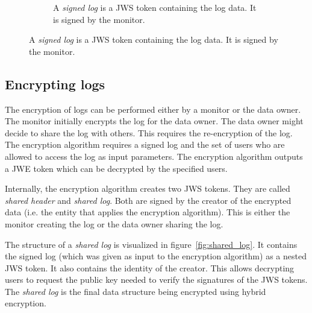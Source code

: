 \documentclass[../main.tex]{subfiles}
\begin{document}
\begin{figure}
\begin{subfigure}
        \centering
        \caption{A \textit{signed log} is a JWS token containing the log data. It is signed by the monitor.}
        \label{fig:signed_log}
    \end{subfigure}
\end{figure}


\subsection{Encrypting logs}
\label{sec:encrypting}
The encryption of logs can be performed either by a monitor or the data owner.
The monitor initially encrypts the log for the data owner.
The data owner might decide to share the log with others.
This requires the re-encryption of the log.
The encryption algorithm requires a signed log and the set of users who are allowed to access the log as input parameters.
The encryption algorithm outputs a JWE token which can be decrypted by the specified users.

Internally, the encryption algorithm creates two JWS tokens.
They are called \textit{shared header} and \textit{shared log}.
Both are signed by the creator of the encrypted data (i.e. the entity that applies the encryption algorithm).
This is either the monitor creating the log or the data owner sharing the log.

The structure of a \textit{shared log} is visualized in figure~\ref{fig:shared_log}.
It contains the signed log (which was given as input to the encryption algorithm) as a nested JWS token.
It also contains the identity of the creator.
This allows decrypting users to request the public key needed to verify the signatures of the JWS tokens.
The \textit{shared log} is the final data structure being encrypted using hybrid encryption.
\end{document}
